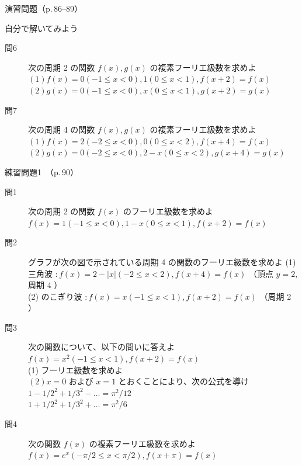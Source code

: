 \documentclass[aspectratio=43,professionalfonts,handout]{beamer}
\begin{document}
\begin{frame}{演習問題（p.\,86--89）}
  \begin{exampleblock}{自分で解いてみよう}
  \begin{description}
    \item[問6] 次の周期 2 の関数 $f(x), g(x)$ の複素フーリエ級数を求めよ
    $(1) f(x) = { 0  (-1 \leq x < 0),  1  (0 \leq x < 1) },  f(x+2) = f(x)$\\
    $(2) g(x) = { 0  (-1 \leq x < 0),  x  (0 \leq x < 1) },  g(x+2) = g(x)$\\
    \item[問7] 次の周期 4 の関数 $f(x), g(x)$ の複素フーリエ級数を求めよ
    $(1) f(x) = { 2  (-2 \leq x < 0),  0  (0 \leq x < 2) },  f(x+4) = f(x)$\\
    $(2) g(x) = { 0  (-2 \leq x < 0),  2-x  (0 \leq x < 2) },  g(x+4) = g(x)$\\
  \end{description}
  \end{exampleblock}
\end{frame}

\begin{frame}{練習問題1　（p.\,90）}
  \begin{block}{}
  \begin{description}
    \item[問1] 次の周期 2 の関数 $f(x)$ のフーリエ級数を求めよ
    $f(x) = { 1  (-1 \leq x < 0),  1-x  (0 \leq x < 1) },  f(x+2) = f(x)$\\
    \item[問2] グラフが次の図で示されている周期 4 の関数のフーリエ級数を求めよ
    (1) 三角波 $: f(x) = 2 - |x| (-2 \leq x < 2), f(x+4) = f(x)$ （頂点 $y=2,$ 周期 4 ）\\
    (2) のこぎり波 $: f(x) = x (-1 \leq x < 1), f(x+2) = f(x)$ （周期 2 ）\\
    \item[問3] 次の関数について、以下の問いに答えよ
    $f(x) = x^{2}  (-1 \leq x < 1),  f(x+2) = f(x)$\\
    (1) フーリエ級数を求めよ\\
    $(2) x=0$ および $x=1$ とおくことにより、次の公式を導け\\
    $1 - 1/2^{2} + 1/3^{2} - \ldots = \pi^{2}/12$\\
    $1 + 1/2^{2} + 1/3^{2} + \ldots = \pi^{2}/6$\\
    \item[問4] 次の関数 $f(x)$ の複素フーリエ級数を求めよ
    $f(x) = e^x  (-\pi/2 \leq x < \pi/2),  f(x+\pi) = f(x)$\\
  \end{description}
  \end{block}
\end{frame}
\end{document}
